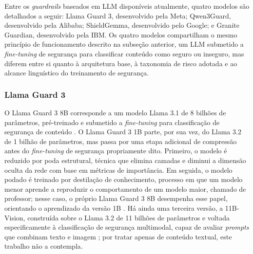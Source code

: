 Entre os \textit{guardrails} baseados em LLM disponíveis atualmente, quatro modelos são detalhados a seguir: Llama Guard 3, desenvolvido pela Meta; Qwen3Guard, desenvolvido pela Alibaba; ShieldGemma, desenvolvido pelo Google; e Granite Guardian, desenvolvido pela IBM. Os quatro modelos compartilham o mesmo princípio de funcionamento descrito na subseção anterior, um LLM submetido a \textit{fine-tuning} de segurança para classificar conteúdo como seguro ou inseguro, mas diferem entre si quanto à arquitetura base, à taxonomia de risco adotada e ao alcance linguístico do treinamento de segurança.

\subsubsection{Llama Guard 3}
\label{subsec:llama-guard-3}

 O Llama Guard 3 8B corresponde a um modelo Llama 3.1 de 8 bilhões de parâmetros, pré-treinado e submetido a \textit{fine-tuning} para classificação de segurança de conteúdo \cite{llamaguard3hf, grattafiori2024llama3herd}. O Llama Guard 3 1B parte, por sua vez, do Llama 3.2 de 1 bilhão de parâmetros, mas passa por uma etapa adicional de compressão antes do \textit{fine-tuning} de segurança propriamente dito. Primeiro, o modelo é reduzido por poda estrutural, técnica que elimina camadas e diminui a dimensão oculta da rede com base em métricas de importância. Em seguida, o modelo podado é treinado por destilação de conhecimento, processo em que um modelo menor aprende a reproduzir o comportamento de um modelo maior, chamado de professor; nesse caso, o próprio Llama Guard 3 8B desempenha esse papel, orientando o aprendizado da versão 1B \cite{llamaguard31bhf}. Há ainda uma terceira versão, a 11B-Vision, construída sobre o Llama 3.2 de 11 bilhões de parâmetros e voltada especificamente à classificação de segurança multimodal, capaz de avaliar \textit{prompts} que combinam texto e imagem \cite{llamaguard311bvisionhf}; por tratar apenas de conteúdo textual, este trabalho não a contempla.

